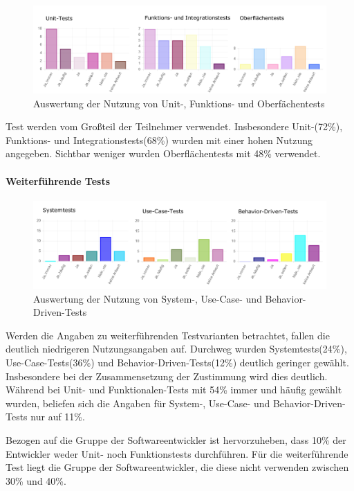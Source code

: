 \begin{figure}[htbp]
  \includegraphics[width=\textwidth, height=\textheight, keepaspectratio]
    {resources/survey-test-usage.pdf}
  \caption{Auswertung der Nutzung von Unit-, Funktions- und Oberfächentests}
\end{figure}

Test werden vom Großteil der Teilnehmer verwendet. Insbesondere Unit-(72\%), Funktions- und Integrationstests(68\%) wurden mit einer hohen Nutzung angegeben. Sichtbar weniger wurden Oberflächentests mit 48\% verwendet.

\paragraph{Weiterführende Tests}

\begin{figure}[htbp]
  \includegraphics[width=\textwidth, height=\textheight, keepaspectratio]
    {resources/survey-test-usage-special.pdf}
  \caption{Auswertung der Nutzung von System-, Use-Case- und Behavior-Driven-Tests}
\end{figure}

Werden die Angaben zu weiterführenden Testvarianten betrachtet, fallen die deutlich niedrigeren Nutzungsangaben auf. Durchweg wurden Systemtests(24\%), Use-Case-Tests(36\%) und Behavior-Driven-Tests(12\%) deutlich geringer gewählt. Insbesondere bei der Zusammensetzung der Zustimmung wird dies deutlich. Während bei Unit- und Funktionalen-Tests mit 54\% \glqq immer\grqq{} und \glqq häufig\grqq{} gewählt wurden, beliefen sich die Angaben für System-, Use-Case- und Behavior-Driven-Tests nur auf 11\%.

Bezogen auf die Gruppe der Softwareentwickler ist hervorzuheben, dass 10\% der Entwickler weder Unit- noch Funktionstests durchführen. Für die weiterführende Test liegt die Gruppe der Softwareentwickler, die diese nicht verwenden zwischen 30\% und 40\%.

